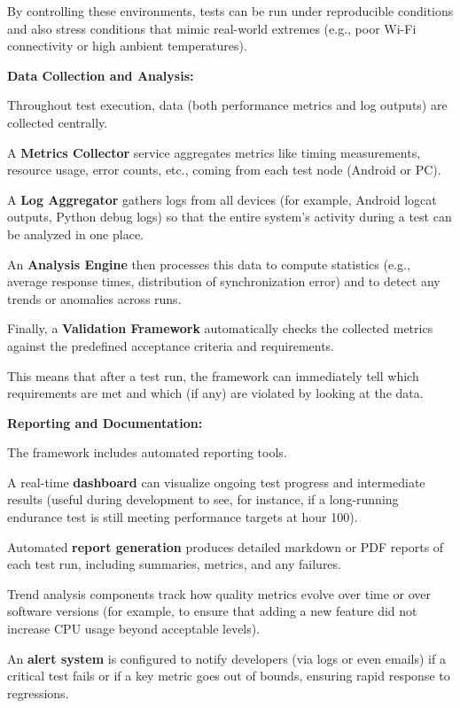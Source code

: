 {{{By controlling these environments, tests can be run under reproducible conditions and also stress conditions that mimic real-world extremes (e.g., poor Wi-Fi connectivity or high ambient temperatures).

\textbf{Data Collection and Analysis:}

Throughout test execution, data (both performance metrics and log outputs) are collected centrally.

A \textbf{Metrics Collector}
 service aggregates metrics like timing measurements, resource usage, error counts, etc., coming from each test node (Android or PC).

A \textbf{Log Aggregator}
 gathers logs from all devices (for example, Android logcat outputs, Python debug logs) so that the entire system's activity during a test can be analyzed in one place.

An \textbf{Analysis Engine}
 then processes this data to compute statistics (e.g., average response times, distribution of synchronization error) and to detect any trends or anomalies across runs.

Finally, a \textbf{Validation Framework}
 automatically checks the collected metrics against the predefined acceptance criteria and requirements.

This means that after a test run, the framework can immediately tell which requirements are met and which (if any) are violated by looking at the data.

\textbf{Reporting and Documentation:}

The framework includes automated reporting tools.

A real-time \textbf{dashboard}
 can visualize ongoing test progress and intermediate results (useful during development to see, for instance, if a long-running endurance test is still meeting performance targets at hour 100).

Automated \textbf{report generation}
 produces detailed markdown or PDF reports of each test run, including summaries, metrics, and any failures.

Trend analysis components track how quality metrics evolve over time or over software versions (for example, to ensure that adding a new feature did not increase CPU usage beyond acceptable levels).

An \textbf{alert system}
 is configured to notify developers (via logs or even emails) if a critical test fails or if a key metric goes out of bounds, ensuring rapid response to regressions.

}}}
